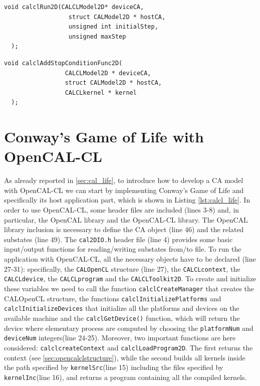\begin{lstlisting}[float,floatplacement=H, label=lst:calclRun2D, caption=The calclRun2D function., numbers=none]
  void calclRun2D(CALCLModel2D* deviceCA,
                  struct CALModel2D * hostCA,
                  unsigned int initialStep,
                  unsigned maxStep
  );
\end{lstlisting}


\begin{lstlisting}[float,floatplacement=H, label=lst:calclAddStopConditionFunc2D, caption=The calclAddStopConditionFunc2D function., numbers=none]
  void calclAddStopConditionFunc2D(
                 CALCLModel2D * deviceCA,
                 struct CALModel2D * hostCA,
                 CALCLkernel * kernel
  );
\end{lstlisting}


\section{Conway's Game of Life with OpenCAL-CL}
 
As already reported in \ref{sec:cal_life}, to introduce how to develop
a CA model with OpenCAL-CL we can start by implementing Conway’s Game
of Life and specifically its host application part, which is shown in
Listing \ref{lst:calcl_life}. In order to use OpenCAL-CL, some header
files are included (lines 3-8) and, in particular, the OpenCAL library
and the OpenCAL-CL library. The OpenCAL library inclusion is necessary
to define the CA object (line 46) and the related substates (line
49). The \verb'cal2DIO.h' header file (line 4) provides some basic
input/output functions for reading/writing substates from/to file. To
run the application with OpenCAL-CL, all the necessary objects have to
be declared (line 27-31): specifically, the \verb'CALOpenCL' structure
(line 27), the \verb'CALCLcontext', the \verb'CALCLdevice', the
\verb'CALCLprogram' and the \verb'CALCLToolkit2D'. To create and
initialize these variables we need to call the function
\verb'calclCreateManager' that creates the CALOpenCL structure, the
functions \verb|calclInitializePlatforms| and
\verb|calclInitializeDevices| that initialize all the platforms and
devices on the available machine and the \verb'calclGetDevice()'
function, which will return the device where elementary process are
computed by choosing the \verb'platformNum' and \verb'deviceNum'
integers(line 24-25). Moreover, two important functions are here
considered: \verb'calclcreateContext' and
\verb'calclLoadProgram2D'. The first returns the context
(see \ref{sec:opencalclstructure}), while the second builds all kernels inside
the path specified by \verb'kernelSrc'(line 15) including the files
specified by \verb'kernelInc'(line 16), and returns a program
containing all the compiled kernels.

